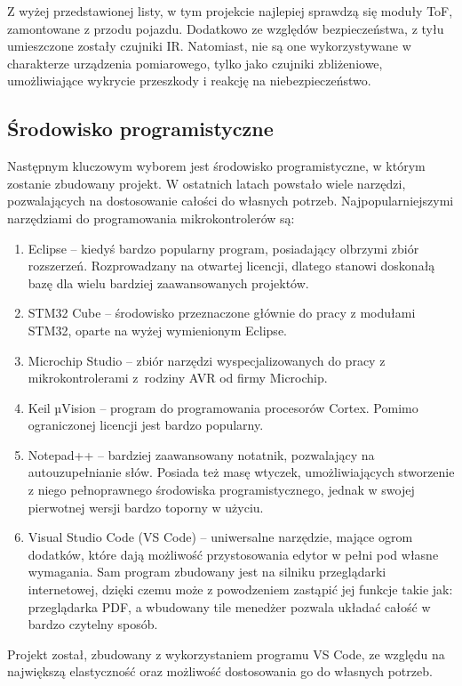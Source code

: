             Z wyżej przedstawionej listy, w tym projekcie najlepiej sprawdzą się moduły ToF, zamontowane z przodu pojazdu.
            Dodatkowo ze względów bezpieczeństwa, z tyłu umieszczone zostały czujniki IR.
            Natomiast, nie są one wykorzystywane w charakterze urządzenia pomiarowego, tylko jako czujniki zbliżeniowe, umożliwiające wykrycie przeszkody i reakcję na niebezpieczeństwo.

    \subsection{Środowisko programistyczne}
        Następnym kluczowym wyborem jest środowisko programistyczne, w którym zostanie zbudowany projekt.
        W ostatnich latach powstało wiele narzędzi, pozwalających na dostosowanie całości do własnych potrzeb.
        Najpopularniejszymi narzędziami do programowania mikrokontrolerów są:
        \begin{enumerate}
            \item Eclipse -- kiedyś bardzo popularny program, posiadający olbrzymi zbiór rozszerzeń.
            Rozprowadzany na otwartej licencji, dlatego stanowi doskonałą bazę dla wielu bardziej zaawansowanych projektów.
            \item STM32 Cube -- środowisko przeznaczone głównie do pracy z modułami STM32, oparte na wyżej wymienionym Eclipse.
            \item Microchip Studio -- zbiór narzędzi wyspecjalizowanych do pracy z mikrokontrolerami z~rodziny AVR od firmy Microchip.
            \item Keil µVision -- program do programowania procesorów Cortex. Pomimo ograniczonej licencji jest bardzo popularny.
            \item Notepad++ -- bardziej zaawansowany notatnik, pozwalający na autouzupełnianie słów.
            Posiada też masę wtyczek, umożliwiających stworzenie z niego pełnoprawnego środowiska programistycznego, jednak w swojej pierwotnej wersji bardzo toporny w użyciu.
            \item Visual Studio Code (VS Code) -- uniwersalne narzędzie, mające ogrom dodatków, które dają możliwość przystosowania edytor w pełni pod własne wymagania.
            Sam program zbudowany jest na silniku przeglądarki internetowej, dzięki czemu może z powodzeniem zastąpić jej funkcje takie jak: przeglądarka PDF, a wbudowany tile menedżer pozwala układać całość w bardzo czytelny sposób.
        \end{enumerate}
        Projekt został, zbudowany z wykorzystaniem programu VS Code, ze względu na największą elastyczność oraz możliwość dostosowania go do własnych potrzeb.


